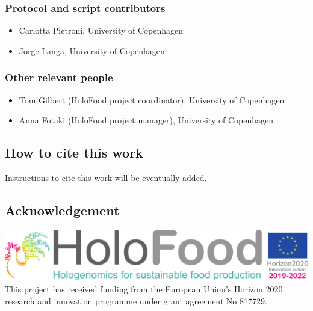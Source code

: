 \documentclass[
]{book}
\providecommand{\tightlist}{%
  \setlength{\itemsep}{0pt}\setlength{\parskip}{0pt}}
\begin{document}
\hypertarget{protocol-and-script-contributors}{%
\subsubsection*{Protocol and script contributors}\label{protocol-and-script-contributors}}

\begin{itemize}
\tightlist
\item
  Carlotta Pietroni, University of Copenhagen
\item
  Jorge Langa, University of Copenhagen
\end{itemize}

\hypertarget{other-relevant-people}{%
\subsubsection*{Other relevant people}\label{other-relevant-people}}

\begin{itemize}
\tightlist
\item
  Tom Gilbert (HoloFood project coordinator), University of Copenhagen
\item
  Anna Fotaki (HoloFood project manager), University of Copenhagen
\end{itemize}

\hypertarget{how-to-cite-this-work}{%
\subsection*{How to cite this work}\label{how-to-cite-this-work}}

Instructions to cite this work will be eventually added.

\hypertarget{acknowledgement}{%
\subsection*{Acknowledgement}\label{acknowledgement}}

\includegraphics{images/holofood_logo_large.png}
This project has received funding from the European Union's Horizon 2020 research and innovation programme under grant agreement No 817729.
\end{document}

